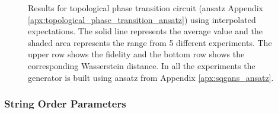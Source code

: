 \begin{figure}[htbp!]
  \caption{Results for topological phase transition circuit (ansatz Appendix
    \ref{apx:topological_phase_transition_ansatz}) using interpolated expectations.
    The solid line represents the average value and the shaded area
    represents the range from 5 different experiments. The upper row shows the
    fidelity and the bottom row shows the corresponding Wasserstein distance. In all the
    experiments the generator is built using ansatz from Appendix
    \ref{apx:sqgans_ansatz}. }
  \label{fig:wqgans_res_interpolated_1}
\end{figure}

\subsubsection{String Order Parameters}

